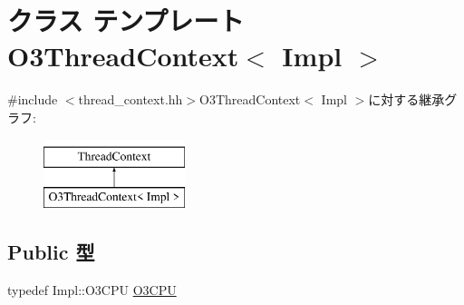 \hypertarget{classO3ThreadContext}{
\section{クラス テンプレート O3ThreadContext$<$ Impl $>$}
\label{classO3ThreadContext}
}


{\ttfamily \#include $<$thread\_\-context.hh$>$}O3ThreadContext$<$ Impl $>$に対する継承グラフ:\begin{figure}[H]
\begin{center}
\leavevmode
\includegraphics[height=2cm]{classO3ThreadContext}
\end{center}
\end{figure}
\subsection*{Public 型}
\begin{DoxyCompactItemize}
\item 
typedef Impl::O3CPU \hyperlink{classO3ThreadContext_a44622cf06940413482836cb62931ac3f}{O3CPU}
\end{DoxyCompactItemize}
